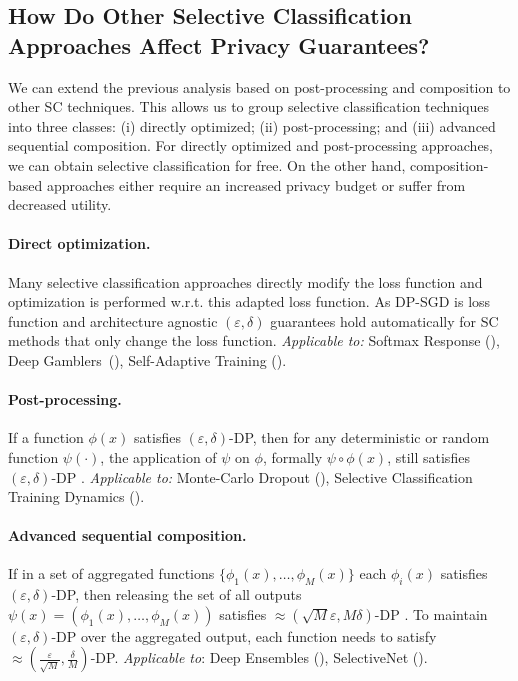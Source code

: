 \subsection{How Do Other Selective Classification Approaches Affect Privacy Guarantees?} %
\label{sec:sc_affects_dp}

We can extend the previous analysis based on post-processing and composition to other SC techniques. This allows us to group selective classification techniques into three classes: (i) directly optimized; (ii) post-processing; and (iii) advanced sequential composition. For directly optimized and post-processing approaches, we can obtain selective classification for free. On the other hand, composition-based approaches either require an increased privacy budget or suffer from decreased utility.

\paragraph{Direct optimization.} Many selective classification approaches directly modify the loss function and optimization is performed w.r.t. this adapted loss function. As DP-SGD is loss function and architecture agnostic $(\varepsilon, \delta)$ guarantees hold automatically for SC methods that only change the loss function. \emph{Applicable to:} Softmax Response (\sr), Deep Gamblers~(\dg), Self-Adaptive Training (\sat).

\paragraph{Post-processing.} If a function $\phi(x)$ satisfies $(\varepsilon,\delta)$-DP, then for any deterministic or random function $\psi(\cdot)$, the application of $\psi$ on $\phi$, formally $\psi \circ \phi (x)$, still satisfies $(\varepsilon,\delta)$-DP \citep{dwork2006calibrating}. \emph{Applicable to:} Monte-Carlo Dropout (\mcdo), Selective Classification Training Dynamics (\sctd).

\paragraph{Advanced sequential composition.} If in a set of aggregated functions $\{\phi_1(x), \ldots, \phi_M(x)\}$ each $\phi_i(x)$ satisfies $(\varepsilon,\delta)$-DP, then releasing the set of all outputs $\psi(x) = (\phi_1(x), \ldots, \phi_M(x))$ satisfies $\approx (\sqrt{M}\varepsilon,M\delta)$-DP \citep{dwork2006calibrating}. To maintain $(\varepsilon, \delta)$-DP over the aggregated output, each function needs to satisfy $\approx(\frac{\varepsilon}{\sqrt M}, \frac{\delta}{M})$-DP. \emph{Applicable to}: Deep Ensembles (\de), SelectiveNet (\sn).

